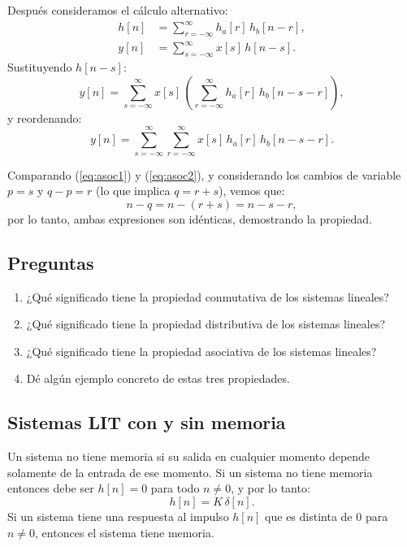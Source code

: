 \documentclass[11pt,a4paper,openany]{book}
\begin{document}
Después consideramos el cálculo alternativo:
\begin{align}
	h[n] &= \sum_{r=-\infty}^{\infty} h_{a}[r] \, h_{b}[n-r], \\
	y[n] &= \sum_{s=-\infty}^{\infty} x[s] \, h[n-s].
\end{align}
Sustituyendo $h[n-s]$:
\begin{equation}
	y[n] = \sum_{s=-\infty}^{\infty} x[s] \, \left( \sum_{r=-\infty}^{\infty} h_{a}[r] \, h_{b}[n - s - r] \right),
\end{equation}
y reordenando:
\begin{equation}
	y[n] = \sum_{s=-\infty}^{\infty} \sum_{r=-\infty}^{\infty} x[s] \, h_{a}[r] \, h_{b}[n - s - r]. \label{eq:asoc2}
\end{equation}

Comparando (\ref{eq:asoc1}) y (\ref{eq:asoc2}), y considerando los cambios de variable $p = s$ y $q - p = r$ (lo que implica $q = r + s$), vemos que:
\begin{equation}
	n - q = n - (r + s) = n - s - r, 
\end{equation}
por lo tanto, ambas expresiones son idénticas, demostrando la propiedad.

\subsection{Preguntas}

\begin{enumerate}
	\item ¿Qué significado tiene la propiedad conmutativa de los sistemas lineales?
	\item ¿Qué significado tiene la propiedad distributiva de los sistemas lineales?
	\item ¿Qué significado tiene la propiedad asociativa de los sistemas lineales?
	\item Dé algún ejemplo concreto de estas tres propiedades.
\end{enumerate}

\subsection{Sistemas LIT con y sin memoria}

Un sistema no tiene memoria si su salida en cualquier momento depende solamente de la entrada de ese momento. Si un sistema no tiene memoria entonces debe ser $h[n]=0$ para todo $n \neq 0$, y por lo tanto:
\begin{equation}
	h[n] = K \, \delta[n] .
\end{equation}
Si un sistema tiene una respuesta al impulso $h[n]$ que es distinta de $0$ para $n \neq 0$, entonces el sistema tiene memoria.
\end{document}
